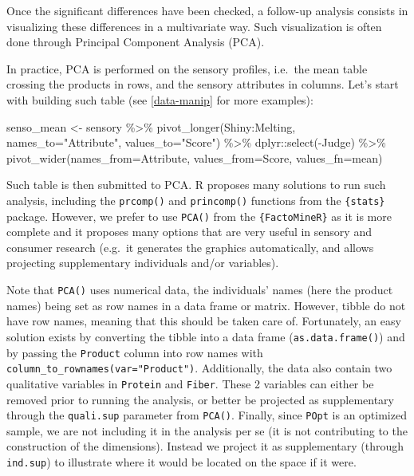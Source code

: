\documentclass[
]{book}
\newenvironment{Shaded}{\begin{snugshade}}{\end{snugshade}}
\newcommand{\AttributeTok}[1]{\textcolor[rgb]{0.77,0.63,0.00}{#1}}
\newcommand{\FunctionTok}[1]{\textcolor[rgb]{0.00,0.00,0.00}{#1}}
\newcommand{\NormalTok}[1]{#1}
\newcommand{\OtherTok}[1]{\textcolor[rgb]{0.56,0.35,0.01}{#1}}
\newcommand{\SpecialCharTok}[1]{\textcolor[rgb]{0.00,0.00,0.00}{#1}}
\newcommand{\StringTok}[1]{\textcolor[rgb]{0.31,0.60,0.02}{#1}}
\begin{document}
Once the significant differences have been checked, a follow-up analysis consists in visualizing these differences in a multivariate way. Such visualization is often done through Principal Component Analysis (PCA).

In practice, PCA is performed on the sensory profiles, i.e.~the mean table crossing the products in rows, and the sensory attributes in columns. Let's start with building such table (see \ref{data-manip} for more examples):

\begin{Shaded}
\begin{Highlighting}[]
\NormalTok{senso\_mean }\OtherTok{\textless{}{-}}\NormalTok{ sensory }\SpecialCharTok{\%\textgreater{}\%} 
  \FunctionTok{pivot\_longer}\NormalTok{(Shiny}\SpecialCharTok{:}\NormalTok{Melting, }\AttributeTok{names\_to=}\StringTok{"Attribute"}\NormalTok{, }\AttributeTok{values\_to=}\StringTok{"Score"}\NormalTok{) }\SpecialCharTok{\%\textgreater{}\%} 
\NormalTok{  dplyr}\SpecialCharTok{::}\FunctionTok{select}\NormalTok{(}\SpecialCharTok{{-}}\NormalTok{Judge) }\SpecialCharTok{\%\textgreater{}\%} 
  \FunctionTok{pivot\_wider}\NormalTok{(}\AttributeTok{names\_from=}\NormalTok{Attribute, }\AttributeTok{values\_from=}\NormalTok{Score, }\AttributeTok{values\_fn=}\NormalTok{mean)}
\end{Highlighting}
\end{Shaded}

Such table is then submitted to PCA. R proposes many solutions to run such analysis, including the \texttt{prcomp()} and \texttt{princomp()} functions from the \texttt{\{stats\}} package. However, we prefer to use \texttt{PCA()} from the \texttt{\{FactoMineR\}} as it is more complete and it proposes many options that are very useful in sensory and consumer research (e.g.~it generates the graphics automatically, and allows projecting supplementary individuals and/or variables).

Note that \texttt{PCA()} uses numerical data, the individuals' names (here the product names) being set as row names in a data frame or matrix. However, tibble do not have row names, meaning that this should be taken care of. Fortunately, an easy solution exists by converting the tibble into a data frame (\texttt{as.data.frame()}) and by passing the \texttt{Product} column into row names with \texttt{column\_to\_rownames(var="Product")}. Additionally, the data also contain two qualitative variables in \texttt{Protein} and \texttt{Fiber}. These 2 variables can either be removed prior to running the analysis, or better be projected as supplementary through the \texttt{quali.sup} parameter from \texttt{PCA()}. Finally, since \texttt{POpt} is an optimized sample, we are not including it in the analysis per se (it is not contributing to the construction of the dimensions). Instead we project it as supplementary (through \texttt{ind.sup}) to illustrate where it would be located on the space if it were.
\end{document}
